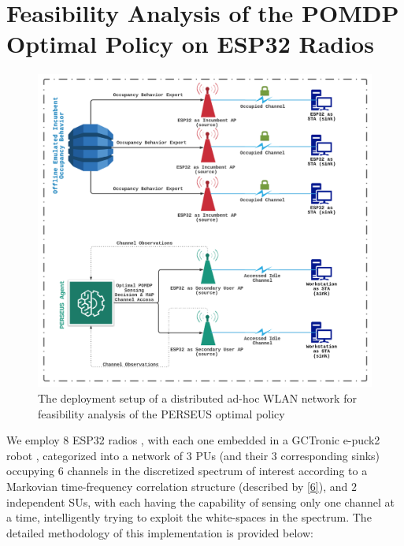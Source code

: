 \documentclass[12pt, draftcls, onecolumn]{IEEEtran}
\begin{document}
\section{Feasibility Analysis of the POMDP Optimal Policy on ESP32 Radios}\label{D}
\begin{figure} [htb]
    \centerline{
    \includegraphics[width = 0.8\linewidth]{figures/Minerva_ESP32_Deployment_Model.png}}
    \caption{The deployment setup of a distributed ad-hoc WLAN network for feasibility analysis of the PERSEUS optimal policy}
    \label{fig: C. 0}
\end{figure}
We employ $8$ ESP32 radios \cite{Espressif:ESP32}, with each one embedded in a GCTronic e-puck2 robot \cite{GCTronic:epuck2}, categorized into a network of $3$ PUs (and their $3$ corresponding sinks) occupying $6$ channels in the discretized spectrum of interest according to a Markovian time-frequency correlation structure (described by \eqref{6}), and $2$ independent SUs, with each having the capability of sensing only one channel at a time, intelligently trying to exploit the white-spaces in the spectrum. The detailed methodology of this implementation is provided below:
\end{document}
